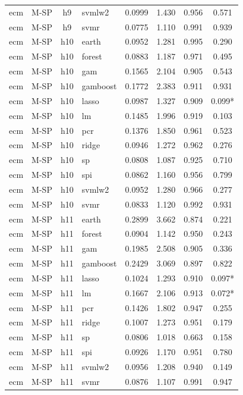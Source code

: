 \begin{ThreePartTable}
\begin{longtable}[t]{llclcccc}
ecm & M-SP & h9 & svmlw2 & 0.0999 & 1.430 & 0.956 & 0.571\\
ecm & M-SP & h9 & svmr & 0.0775 & 1.110 & 0.991 & 0.939\\
\addlinespace
ecm & M-SP & h10 & earth & 0.0952 & 1.281 & 0.995 & 0.290\\
ecm & M-SP & h10 & forest & 0.0883 & 1.187 & 0.971 & 0.495\\
ecm & M-SP & h10 & gam & 0.1565 & 2.104 & 0.905 & 0.543\\
ecm & M-SP & h10 & gamboost & 0.1772 & 2.383 & 0.911 & 0.931\\
ecm & M-SP & h10 & lasso & 0.0987 & 1.327 & 0.909 & 0.099*\\
ecm & M-SP & h10 & lm & 0.1485 & 1.996 & 0.919 & 0.103\\
ecm & M-SP & h10 & pcr & 0.1376 & 1.850 & 0.961 & 0.523\\
ecm & M-SP & h10 & ridge & 0.0946 & 1.272 & 0.962 & 0.276\\
ecm & M-SP & h10 & sp & 0.0808 & 1.087 & 0.925 & 0.710\\
ecm & M-SP & h10 & spi & 0.0862 & 1.160 & 0.956 & 0.799\\
ecm & M-SP & h10 & svmlw2 & 0.0952 & 1.280 & 0.966 & 0.277\\
ecm & M-SP & h10 & svmr & 0.0833 & 1.120 & 0.992 & 0.931\\
\addlinespace
ecm & M-SP & h11 & earth & 0.2899 & 3.662 & 0.874 & 0.221\\
ecm & M-SP & h11 & forest & 0.0904 & 1.142 & 0.950 & 0.243\\
ecm & M-SP & h11 & gam & 0.1985 & 2.508 & 0.905 & 0.336\\
ecm & M-SP & h11 & gamboost & 0.2429 & 3.069 & 0.897 & 0.822\\
ecm & M-SP & h11 & lasso & 0.1024 & 1.293 & 0.910 & 0.097*\\
ecm & M-SP & h11 & lm & 0.1667 & 2.106 & 0.913 & 0.072*\\
ecm & M-SP & h11 & pcr & 0.1426 & 1.802 & 0.947 & 0.255\\
ecm & M-SP & h11 & ridge & 0.1007 & 1.273 & 0.951 & 0.179\\
ecm & M-SP & h11 & sp & 0.0806 & 1.018 & 0.663 & 0.158\\
ecm & M-SP & h11 & spi & 0.0926 & 1.170 & 0.951 & 0.780\\
ecm & M-SP & h11 & svmlw2 & 0.0956 & 1.208 & 0.940 & 0.149\\
ecm & M-SP & h11 & svmr & 0.0876 & 1.107 & 0.991 & 0.947\\

\end{longtable}
\end{ThreePartTable}
